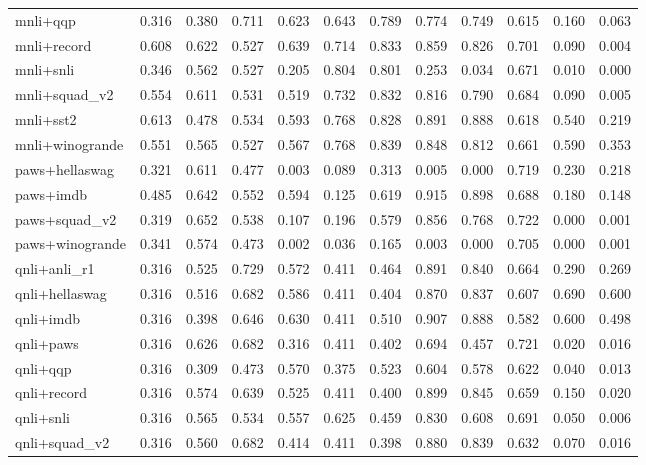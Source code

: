 \begin{table}[t]
\begin{tabular}{lrrrrrrrrrrr}
    mnli+qqp & 0.316 & 0.380 & 0.711 & 0.623 & 0.643 & 0.789 & 0.774 & 0.749 & 0.615 & 0.160 & 0.063 \\
    mnli+record & 0.608 & 0.622 & 0.527 & 0.639 & 0.714 & 0.833 & 0.859 & 0.826 & 0.701 & 0.090 & 0.004 \\
    mnli+snli & 0.346 & 0.562 & 0.527 & 0.205 & 0.804 & 0.801 & 0.253 & 0.034 & 0.671 & 0.010 & 0.000 \\
    mnli+squad\_v2 & 0.554 & 0.611 & 0.531 & 0.519 & 0.732 & 0.832 & 0.816 & 0.790 & 0.684 & 0.090 & 0.005 \\
    mnli+sst2 & 0.613 & 0.478 & 0.534 & 0.593 & 0.768 & 0.828 & 0.891 & 0.888 & 0.618 & 0.540 & 0.219 \\
    mnli+winogrande & 0.551 & 0.565 & 0.527 & 0.567 & 0.768 & 0.839 & 0.848 & 0.812 & 0.661 & 0.590 & 0.353 \\
    paws+hellaswag & 0.321 & 0.611 & 0.477 & 0.003 & 0.089 & 0.313 & 0.005 & 0.000 & 0.719 & 0.230 & 0.218 \\
    paws+imdb & 0.485 & 0.642 & 0.552 & 0.594 & 0.125 & 0.619 & 0.915 & 0.898 & 0.688 & 0.180 & 0.148 \\
    paws+squad\_v2 & 0.319 & 0.652 & 0.538 & 0.107 & 0.196 & 0.579 & 0.856 & 0.768 & 0.722 & 0.000 & 0.001 \\
    paws+winogrande & 0.341 & 0.574 & 0.473 & 0.002 & 0.036 & 0.165 & 0.003 & 0.000 & 0.705 & 0.000 & 0.001 \\
    qnli+anli\_r1 & 0.316 & 0.525 & 0.729 & 0.572 & 0.411 & 0.464 & 0.891 & 0.840 & 0.664 & 0.290 & 0.269 \\
    qnli+hellaswag & 0.316 & 0.516 & 0.682 & 0.586 & 0.411 & 0.404 & 0.870 & 0.837 & 0.607 & 0.690 & 0.600 \\
    qnli+imdb & 0.316 & 0.398 & 0.646 & 0.630 & 0.411 & 0.510 & 0.907 & 0.888 & 0.582 & 0.600 & 0.498 \\
    qnli+paws & 0.316 & 0.626 & 0.682 & 0.316 & 0.411 & 0.402 & 0.694 & 0.457 & 0.721 & 0.020 & 0.016 \\
    qnli+qqp & 0.316 & 0.309 & 0.473 & 0.570 & 0.375 & 0.523 & 0.604 & 0.578 & 0.622 & 0.040 & 0.013 \\
    qnli+record & 0.316 & 0.574 & 0.639 & 0.525 & 0.411 & 0.400 & 0.899 & 0.845 & 0.659 & 0.150 & 0.020 \\
    qnli+snli & 0.316 & 0.565 & 0.534 & 0.557 & 0.625 & 0.459 & 0.830 & 0.608 & 0.691 & 0.050 & 0.006 \\
    qnli+squad\_v2 & 0.316 & 0.560 & 0.682 & 0.414 & 0.411 & 0.398 & 0.880 & 0.839 & 0.632 & 0.070 & 0.016 \\

\end{tabular}
\end{table}
